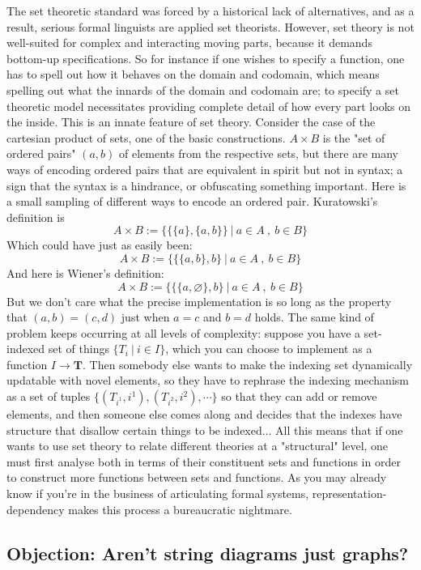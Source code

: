 The set theoretic standard was forced by a historical lack of alternatives, and as a result, serious formal linguists are applied set theorists. However, set theory is not well-suited for complex and interacting moving parts, because it demands bottom-up specifications. So for instance if one wishes to specify a function, one has to spell out how it behaves on the domain and codomain, which means spelling out what the innards of the domain and codomain are; to specify a set theoretic model necessitates providing complete detail of how every part looks on the inside. This is an innate feature of set theory. Consider the case of the cartesian product of sets, one of the basic constructions. $A \times B$ is the "set of ordered pairs" $(a,b)$ of elements from the respective sets, but there are many ways of encoding ordered pairs that are equivalent in spirit but not in syntax; a sign that the syntax is a hindrance, or obfuscating something important. Here is a small sampling of different ways to encode an ordered pair. Kuratowski's definition is
\[A \times B := \bigg\{ \{\{a\},\{a,b\}\} \ | \ a \in A \ , \ b \in B \bigg\}\]
Which could have just as easily been:
\[A \times B := \bigg\{ \{\{a,b\},b\} \ | \ a \in A \ , \ b \in B \bigg\}\]
And here is Wiener's definition:
\[A \times B := \bigg\{ \{\{a,\varnothing\},b\} \ | \ a \in A \ , \ b \in B \bigg\}\]
But we don't care what the precise implementation is so long as the property that $(a,b) = (c,d)$ just when $a = c$ and $b = d$ holds. The same kind of problem keeps occurring at all levels of complexity: suppose you have a set-indexed set of things $\{T_i \ | \ i \in I\}$, which you can choose to implement as a function $I \rightarrow \mathbf{T}$. Then somebody else wants to make the indexing set dynamically updatable with novel elements, so they have to rephrase the indexing mechanism as a set of tuples $\{(T_{i^1},i^1), (T_{i^2},i^2), \cdots\}$ so that they can add or remove elements, and then someone else comes along and decides that the indexes have structure that disallow certain things to be indexed... All this means that if one wants to use set theory to relate different theories at a "structural" level, one must first analyse both in terms of their constituent sets and functions in order to construct more functions between sets and functions. As you may already know if you're in the business of articulating formal systems, representation-dependency makes this process a bureaucratic nightmare.\\

\subsection{\textbf{Objection:} Aren't string diagrams just graphs?}

